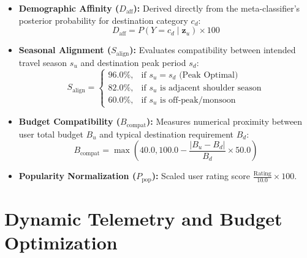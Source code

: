 \documentclass[conference]{IEEEtran}
\begin{document}
\begin{itemize}
    \item \textbf{Demographic Affinity ($D_{\text{aff}}$):} Derived directly from the meta-classifier's posterior probability for destination category $c_d$:
    \begin{equation}
    D_{\text{aff}} = P(Y = c_d \mid \mathbf{z}_u) \times 100
    \end{equation}
    \item \textbf{Seasonal Alignment ($S_{\text{align}}$):} Evaluates compatibility between intended travel season $s_u$ and destination peak period $s_d$:
    \begin{equation}
    S_{\text{align}} = 
    \begin{cases}
    96.0\%, & \text{if } s_u = s_d \text{ (Peak Optimal)} \\
    82.0\%, & \text{if } s_u \text{ is adjacent shoulder season} \\
    60.0\%, & \text{if } s_u \text{ is off-peak/monsoon}
    \end{cases}
    \end{equation}
    \item \textbf{Budget Compatibility ($B_{\text{compat}}$):} Measures numerical proximity between user total budget $B_u$ and typical destination requirement $B_d$:
    \begin{equation}
    B_{\text{compat}} = \max\left(40.0, 100.0 - \frac{|B_u - B_d|}{B_d} \times 50.0\right)
    \end{equation}
    \item \textbf{Popularity Normalization ($P_{\text{pop}}$):} Scaled user rating score $\frac{\text{Rating}}{10.0} \times 100$.
\end{itemize}

\section{Dynamic Telemetry and Budget Optimization}
\end{document}
